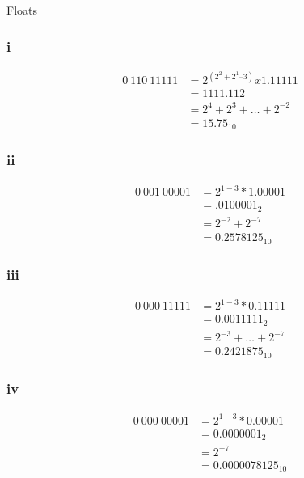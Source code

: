 \documentclass[12pt]{article}
\newenvironment{problem}[2][Problem]{\begin{trivlist}
\item[\hskip \labelsep {\bfseries #1}\hskip \labelsep {\bfseries #2.}]}{\end{trivlist}}
\begin{document}
\begin{problem}{2} Floats
 \subsubsection*{i}
\begin{align*}
0\: 110\: 11111 &= 2^(2^2+2^1 – 3) x 1.11111 \\
&= 1111.112\\
&= 2^4 + 2^3 +\dots{}+2^{-2}\\
&= 15.75_10
\end{align*}

 \subsubsection*{ii}
\begin{align*}
0\: 001\: 00001&= 2^{1-3} * 1.00001\\
&= .0100001_2\\
&= 2^{-2} + 2^{-7 }\\
&= 0.2578125_10
\end{align*}

 \subsubsection*{iii}
\begin{align*}
0\: 000\: 11111&= 2^{1-3} * 0.11111\\
&= 0.0011111_2\\
&= 2^{-3} +\dots{}+ 2^{-7}\\
&= 0.2421875_10
\end{align*}

 \subsubsection*{iv}
\begin{align*}
0\: 000\: 00001&= 2^{1-3} * 0.00001\\
&= 0.0000001_2\\
&= 2^{-7}\\
&= 0.0000078125_10
\end{align*}
\end{problem}
\end{document}
